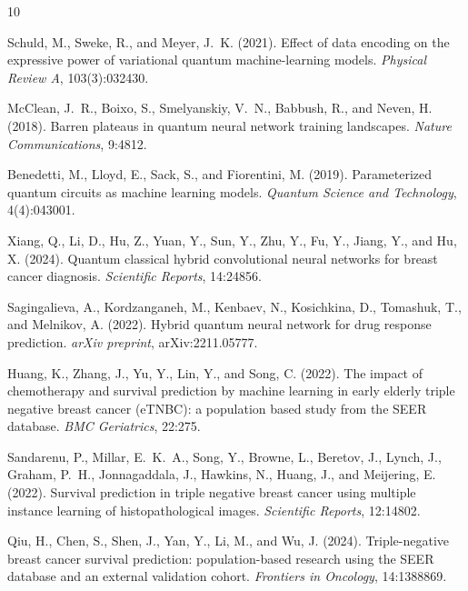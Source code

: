 \documentclass[12pt, letterpaper]{article}
\begin{document}

\begin{thebibliography}{10}

Schuld, M., Sweke, R., and Meyer, J.~K. (2021).
\newblock Effect of data encoding on the expressive power of variational quantum machine-learning models.
\newblock \textit{Physical Review A}, 103(3):032430.

McClean, J.~R., Boixo, S., Smelyanskiy, V.~N., Babbush, R., and Neven, H. (2018).
\newblock Barren plateaus in quantum neural network training landscapes.
\newblock \textit{Nature Communications}, 9:4812.

Benedetti, M., Lloyd, E., Sack, S., and Fiorentini, M. (2019).
\newblock Parameterized quantum circuits as machine learning models.
\newblock \textit{Quantum Science and Technology}, 4(4):043001.

Xiang, Q., Li, D., Hu, Z., Yuan, Y., Sun, Y., Zhu, Y., Fu, Y., Jiang, Y., and Hu, X. (2024).
\newblock Quantum classical hybrid convolutional neural networks for breast cancer diagnosis.
\newblock \textit{Scientific Reports}, 14:24856.

Sagingalieva, A., Kordzanganeh, M., Kenbaev, N., Kosichkina, D., Tomashuk, T., and Melnikov, A. (2022).
\newblock Hybrid quantum neural network for drug response prediction.
\newblock \textit{arXiv preprint}, arXiv:2211.05777.

Huang, K., Zhang, J., Yu, Y., Lin, Y., and Song, C. (2022).
\newblock The impact of chemotherapy and survival prediction by machine learning in early elderly triple negative breast cancer (eTNBC): a population based study from the SEER database.
\newblock \textit{BMC Geriatrics}, 22:275.

Sandarenu, P., Millar, E.~K.~A., Song, Y., Browne, L., Beretov, J., Lynch, J., Graham, P.~H., Jonnagaddala, J., Hawkins, N., Huang, J., and Meijering, E. (2022).
\newblock Survival prediction in triple negative breast cancer using multiple instance learning of histopathological images.
\newblock \textit{Scientific Reports}, 12:14802.

Qiu, H., Chen, S., Shen, J., Yan, Y., Li, M., and Wu, J. (2024).
\newblock Triple-negative breast cancer survival prediction: population-based research using the SEER database and an external validation cohort.
\newblock \textit{Frontiers in Oncology}, 14:1388869.


\end{thebibliography}
\end{document}
